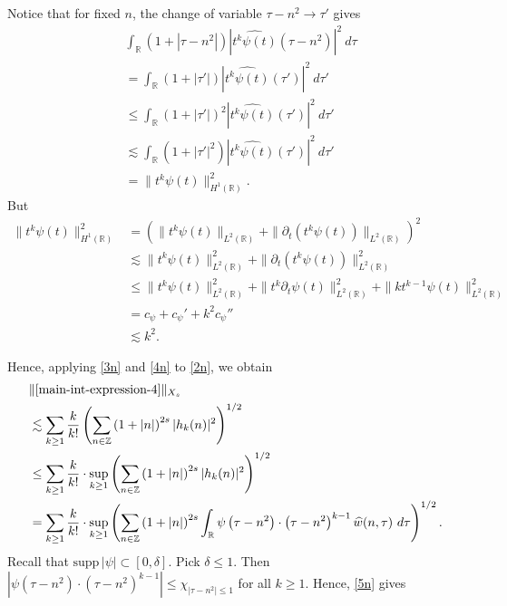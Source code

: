 \documentclass[handout]{beamer}
\numberwithin{equation}{section}
\newcommand{\rr}{\mathbb{R}}
\newcommand{\p}{\partial}
\newcommand{\zz}{\mathbb{Z}}
\newcommand{\wh}{\widehat}
\begin{document}
\begin{frame}
Notice that for fixed $n$, the change of variable $\tau - n^{2 } \to \tau'$
gives
%
%
\begin{equation}
	\label{3n}
	\begin{split}
		& \int_\rr \left( 1 + | \tau - n^{2 } | \right) | \wh{t^{k}
		\psi(t)}\left( \tau - n^{2 } \right) |^2 \ d \tau
		\\
		& = \int_\rr \left( 1 + |\tau'| \right) | \wh{t^k \psi(t)}(\tau') |^2 \
		d \tau'
		\\
		& \le \int_\rr \left( 1 + |\tau'| \right)^2 | \wh{t^k \psi(t)}(\tau')
		|^2 \ d \tau'
		\\
		& \lesssim \int_\rr \left( 1 + | \tau' |^2 \right) | \wh{t^{k}
		\psi(t)}(\tau') |^2 \ d \tau'
		\\
		& = \|t^k \psi(t) \|_{H^1(\rr)}^2.
	\end{split}
\end{equation}
%
%
But
%
%
\begin{equation}
	\label{4n}
	\begin{split}
		\|t^k \psi(t) \|_{H^1(\rr)}^2
		& = \left( \|t^k \psi(t)\|_{L^2(\rr)} + \|\p_t \left( t^k \psi(t)
		\right)\|_{L^2(\rr)} \right)^2
		\\
		& \lesssim \|t^{k}\psi(t) \|_{L^2(\rr)}^2 + \|\p_t \left (t^{k}
		\psi(t) \right )\|_{L^2(\rr)}^2
		\\
		& \le \|t^k \psi(t) \|_{L^2(\rr)}^2 + \|t^k \p_t \psi(t)
		\|_{L^2(\rr)}^2 + \|k t^{k -1} \psi(t) \|_{L^2(\rr)}^2
		\\
		& = c_{\psi} + c_{\psi}' + k^2 c_{\psi}''
		\\
		& \lesssim k^2.
	\end{split}
\end{equation}

\end{frame}
%
%
\begin{frame}

Hence, applying \eqref{3n} and \eqref{4n} to \eqref{2n}, we obtain
%
\begin{equation}
	\label{5n}
	\begin{split}
		& \|\eqref{main-int-expression-4} \|_{X_s}
		\\
		& \lesssim
		\sum_{k \ge 1} \frac{k}{k!} \left( \sum_{n \in \zz} \left(1 + |n| \right)^{2s} | h_k(n) |^2 
		\right)^{1/2}
		\\
		& \le \sum_{k \ge 1} \frac{k}{k!}
		\cdot \sup_{k \ge 1} \left( \sum_{n \in \zz} \left(1 + |n| \right)^{2s} | 
		h_k(n) |^2 \right)^{1/2}
		\\
		& = \sum_{k \ge 1} \frac{k}{k!} \cdot \sup_{k \ge 1} 
		\left( \sum_{n \in \zz} \left(1 + |n| \right)^{2s} \int_\rr 
		\psi\left( \tau - n^{2 } \right) \cdot \left( \tau - n^{2 } 
		\right)^{k -1} \wh{w}(n, \tau) \ d \tau \right)^{1/2}.
	\end{split}
\end{equation}
%
Recall that $\text{supp} \, |\psi| \subset [0, \delta ]$. Pick $\delta \le 1$. 
Then $| \psi\left( \tau - n^{2 } \right) \cdot \left( \tau - n^{2 } \right)^{k 
-1} | \le \chi_{| \tau - n^{2 } | \le 1}$ for all $k \ge 1$. Hence, \eqref{5n} gives
%
\end{frame}
\end{document}
